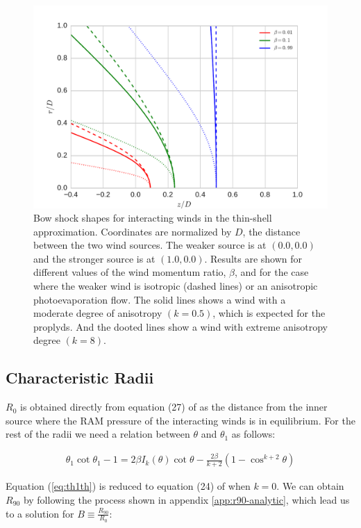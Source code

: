 \begin{figure}
\includegraphics[width=\linewidth]{r-beta}
\caption{Bow shock shapes for interacting winds in the thin-shell
  approximation. Coordinates are normalized by $D$, the distance
  between the two wind sources.  The weaker source is at \((0.0, 0.0)\)
  and the stronger source is at \((1.0, 0.0)\).  Results are shown for
  different values of the wind momentum ratio, \(\beta\), and for the
  case where the weaker wind is isotropic (dashed lines) or an
  anisotropic photoevaporation flow. The solid lines shows a wind with a
  moderate degree of anisotropy $(k=0.5)$, which is expected for the proplyds.
  And the dooted lines show a wind with extreme anisotropy degree $(k=8)$.}
\label{fig:r-beta}
\end{figure}


\subsection{Characteristic Radii}
$R_0$ is obtained directly from equation (27) of \CRW{} as the distance from the inner source where the RAM pressure of the interacting winds is in equilibrium.
For the rest of the radii we need a relation between $\theta$ and $\theta_1$ as follows:


\begin{align}
\theta_1\cot\theta_1 -1 = 2\beta I_k(\theta) \cot\theta - \frac{2\beta}{k+2}\left(1-\cos^{k+2}\theta\right)
\label{eq:th1th}
\end{align}

Equation (\ref{eq:th1th}) is reduced to equation (24) of \CRW{} when $k=0$.
We can obtain $R_{90}$ by following the process shown in appendix \ref{app:r90-analytic},
which lead us to a solution for $B \equiv \frac{R_{90}}{R_0}$:

